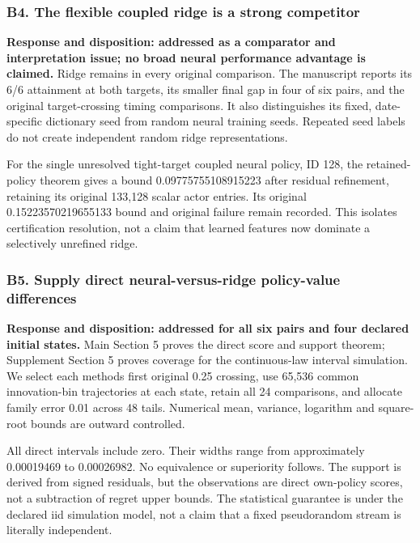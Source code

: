 \documentclass[ecta,nameyear,draft]{econsocart}
\begin{document}
\hypertarget{b4-the-flexible-coupled-ridge-is-a-strong-competitor}{%
\subsubsection{B4. The flexible coupled ridge is a strong
competitor}\label{b4-the-flexible-coupled-ridge-is-a-strong-competitor}}

\textbf{Response and disposition: addressed as a comparator and
interpretation issue; no broad neural performance advantage is claimed.}
Ridge remains in every original comparison. The manuscript reports its
6/6 attainment at both targets, its smaller final gap in four of six
pairs, and the original target-crossing timing comparisons. It also
distinguishes its fixed, date-specific dictionary seed from random
neural training seeds. Repeated seed labels do not create independent
random ridge representations.

For the single unresolved tight-target coupled neural policy, ID 128,
the retained-policy theorem gives a bound 0.09775755108915223 after
residual refinement, retaining its original 133,128 scalar actor
entries. Its original 0.15223570219655133 bound and original failure
remain recorded. This isolates certification resolution, not a claim
that learned features now dominate a selectively unrefined ridge.

\hypertarget{b5-supply-direct-neural-versus-ridge-policy-value-differences}{%
\subsubsection{B5. Supply direct neural-versus-ridge policy-value
differences}\label{b5-supply-direct-neural-versus-ridge-policy-value-differences}}

\textbf{Response and disposition: addressed for all six pairs and four
declared initial states.} Main Section 5 proves the direct score and
support theorem; Supplement Section 5 proves coverage for the
continuous-law interval simulation. We select each
method\textquotesingle s first original 0.25 crossing, use 65,536 common
innovation-bin trajectories at each state, retain all 24 comparisons,
and allocate family error 0.01 across 48 tails. Numerical mean,
variance, logarithm and square-root bounds are outward controlled.

All direct intervals include zero. Their widths range from approximately
0.00019469 to 0.00026982. No equivalence or superiority follows. The
support is derived from signed residuals, but the observations are
direct own-policy scores, not a subtraction of regret upper bounds. The
statistical guarantee is under the declared iid simulation model, not a
claim that a fixed pseudorandom stream is literally independent.
\end{document}
